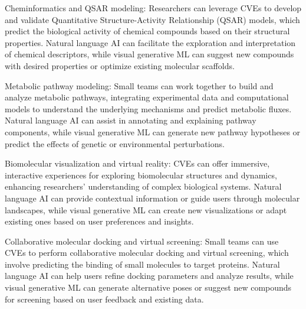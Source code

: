     Cheminformatics and QSAR modeling:
    Researchers can leverage CVEs to develop and validate Quantitative Structure-Activity Relationship (QSAR) models, which predict the biological activity of chemical compounds based on their structural properties. Natural language AI can facilitate the exploration and interpretation of chemical descriptors, while visual generative ML can suggest new compounds with desired properties or optimize existing molecular scaffolds.

    Metabolic pathway modeling:
    Small teams can work together to build and analyze metabolic pathways, integrating experimental data and computational models to understand the underlying mechanisms and predict metabolic fluxes. Natural language AI can assist in annotating and explaining pathway components, while visual generative ML can generate new pathway hypotheses or predict the effects of genetic or environmental perturbations.

    Biomolecular visualization and virtual reality:
    CVEs can offer immersive, interactive experiences for exploring biomolecular structures and dynamics, enhancing researchers' understanding of complex biological systems. Natural language AI can provide contextual information or guide users through molecular landscapes, while visual generative ML can create new visualizations or adapt existing ones based on user preferences and insights.

    Collaborative molecular docking and virtual screening:
    Small teams can use CVEs to perform collaborative molecular docking and virtual screening, which involve predicting the binding of small molecules to target proteins. Natural language AI can help users refine docking parameters and analyze results, while visual generative ML can generate alternative poses or suggest new compounds for screening based on user feedback and existing data.